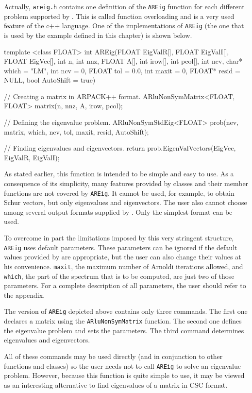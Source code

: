 Actually, \texttt{areig.h} contains one definition of the \texttt{AREig} function for each different problem supported by \ARP{}. This is called function overloading and is a very used feature of the c++ language. One of the implementations of \texttt{AREig} (the one that is used by the example defined in this chapter) is shown below.
\begin{cppcode}
template <class FLOAT>
int AREig(FLOAT EigValR[], FLOAT EigValI[], FLOAT EigVec[], int n, 
	int nnz, FLOAT A[], int irow[], int pcol[], int nev, 
	char* which = "LM", int ncv = 0, FLOAT tol = 0.0, 
	int maxit = 0, FLOAT* resid = NULL, bool AutoShift = true)
{
	// Creating a matrix in ARPACK++ format.
	ARluNonSymMatrix<FLOAT, FLOAT> matrix(n, nnz, A, irow, pcol);
	
	// Defining the eigenvalue problem.
	ARluNonSymStdEig<FLOAT> prob(nev, matrix, which, ncv, 
		tol, maxit, resid, AutoShift);
	
	// Finding eigenvalues and eigenvectors.
	return prob.EigenValVectors(EigVec, EigValR, EigValI); 
}
\end{cppcode}
As stated earlier, this function is intended to be simple and easy to use. As a consequence of its simplicity, many features provided by \ARPP{} classes and their member functions are not covered by \texttt{AREig}. It cannot be used, for example, to obtain Schur vectors, but only eigenvalues and eigenvectors. The user also cannot choose among several output formats supplied by \ARPP{}. Only the simplest format can be used.

To overcome in part the limitations imposed by this very stringent structure, \texttt{AREig} uses default parameters. These parameters can be ignored if the default values provided by \ARPP{} are appropriate, but the user can also change their values at his convenience. \texttt{maxit}, the maximum number of Arnoldi iterations allowed, and \texttt{which}, the part of the spectrum that is to be computed, are just two of those parameters. For a complete description of all \ARPP{} parameters, the user should refer to the appendix.

The version of \texttt{AREig} depicted above contains only three commands. The first one declares a matrix using the \texttt{ARluNonSymMatrix} function. The second one defines the eigenvalue problem and sets the \ARPP{} parameters. The third command determines eigenvalues and eigenvectors.

All of these commands may be used directly (and in conjunction to other \ARPP{} functions and classes) so the user needs not to call \texttt{AREig} to solve an eigenvalue problem. However, because this function is quite simple to use, it may be viewed as an interesting alternative to find eigenvalues of a matrix in CSC format.
